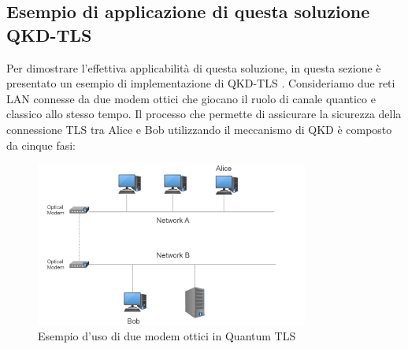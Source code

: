 \subsection{Esempio di applicazione di questa soluzione QKD-TLS}
Per dimostrare l'effettiva applicabilità di questa soluzione, in questa sezione è presentato un esempio di implementazione di QKD-TLS \cite{laurenti_integration_nodate}. Consideriamo due reti LAN connesse da due modem ottici che giocano il ruolo di canale quantico e classico
allo stesso tempo. Il processo che permette di assicurare la sicurezza della connessione TLS tra Alice e Bob utilizzando il meccanismo di QKD è composto da cinque fasi:
\begin{figure}[H]
    \centering
    \includegraphics[width=0.8\textwidth]{MainContent/img/cap3/EsempioTLS.png}
    \caption{Esempio d’uso di due modem ottici in Quantum TLS}
    \label{fig:esempio}
\end{figure}


